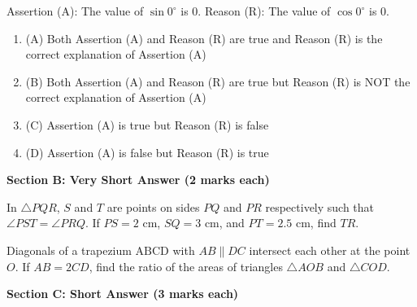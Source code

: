 \documentclass[12pt,a4paper]{exam}
\begin{document}
\begin{questions}
\question[1] Assertion (A): The value of $\sin 0^\circ$ is $0$. Reason (R): The value of $\cos 0^\circ$ is $0$.
\begin{enumerate}[label=(\Alph*)]
  \item (A) Both Assertion (A) and Reason (R) are true and Reason (R) is the correct explanation of Assertion (A)
  \item (B) Both Assertion (A) and Reason (R) are true but Reason (R) is NOT the correct explanation of Assertion (A)
  \item (C) Assertion (A) is true but Reason (R) is false
  \item (D) Assertion (A) is false but Reason (R) is true
\end{enumerate}
\vspace{0.15cm}

\end{questions}
\bigskip
\noindent\textbf{\large Section B: Very Short Answer (2 marks each)}

\begin{questions}
\question[2] In $\triangle PQR$, $S$ and $T$ are points on sides $PQ$ and $PR$ respectively such that $\angle PST = \angle PRQ$. If $PS = 2\text{ cm}$, $SQ = 3\text{ cm}$, and $PT = 2.5\text{ cm}$, find $TR$.
\vspace{0.15cm}

\question[2] Diagonals of a trapezium $\text{ABCD}$ with $AB \parallel DC$ intersect each other at the point $O$. If $AB = 2CD$, find the ratio of the areas of triangles $\triangle AOB$ and $\triangle COD$.
\vspace{0.15cm}

\end{questions}
\bigskip
\noindent\textbf{\large Section C: Short Answer (3 marks each)}
\end{document}
